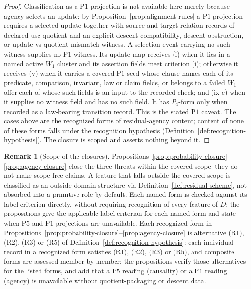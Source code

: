\documentclass[11pt]{article}
\theoremstyle{definition}
\newtheorem{remark}[theorem]{Remark}
\newcommand{\Pone}{\ensuremath{\mathrm{P1}}}
\newcommand{\Pfive}{\ensuremath{\mathrm{P5}}}
\begin{document}
\begin{proof}
Classification as a \Pone{} projection is not available here merely
because agency selects an update: by
Proposition~\ref{prop:alignment-rules} a \Pone{} projection requires a
selected update together with source and target relation records of declared use quotient and an
explicit descent-compatibility, descent-obstruction, or
update-vs-quotient mismatch witness. A selection event carrying no such
witness supplies no \Pone{} witness. Its update map receives (i) when it lies
in a named active \(W_1\) cluster and its assertion fields meet criterion (i);
otherwise it receives (v) when it carries a covered \Pone{} seed whose clause
names each of its predicate, comparison, invariant, law or claim fields, or
belongs to a failed \(W_1\) offer each of whose such fields is an input to the
recorded check; and (ix-c) when it supplies no witness field and has no such
field. It has \(P_4\)-form only when recorded as a
law-bearing transition record. This is the stated \Pone{} caveat. The cases
above are the recognized forms of residual-agency content; content of none of
these forms falls under the recognition hypothesis
(Definition~\ref{def:recognition-hypothesis}). The closure is scoped and asserts
nothing beyond it.
\end{proof}

\begin{remark}[Scope of the closures]\label{rem:threat-closures-scope}
Propositions~\ref{prop:probability-closure}--\ref{prop:agency-closure}
close the three threats within the covered scope; they do not make
scope-free claims. A feature that falls outside the covered scope is
classified as an outside-domain structure via
Definition~\ref{def:residual-scheme}, not absorbed into a primitive role
by default. Each named form is checked against its label criterion directly, without
requiring recognition of every feature of \(D\); the propositions give the
applicable label criterion for each named form and state when \Pfive{} and
\Pone{} projections are unavailable. Each recognized form in
Propositions~\ref{prop:probability-closure}--\ref{prop:agency-closure} is
alternative (R1), (R2), (R3) or (R5) of Definition~\ref{def:recognition-hypothesis}:
each individual record in a recognized form satisfies (R1), (R2), (R3) or (R5), and
composite forms are assessed member by member; the propositions verify those alternatives for
the listed forms, and add that a \Pfive{} reading (causality) or a \Pone{}
reading (agency) is unavailable without quotient-packaging or descent data.
\end{remark}
\end{document}
